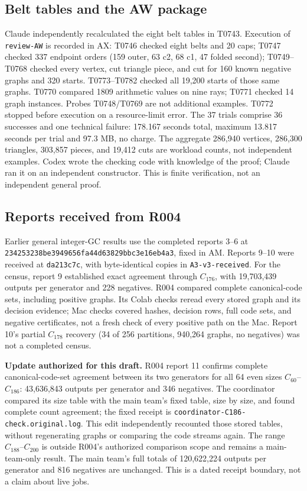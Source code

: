 \documentclass[11pt]{amsart}
\newcommand{\record}[1]{\nolinkurl{#1}}
\begin{document}
\subsection{Belt tables and the AW package}
Claude independently recalculated the eight belt tables in T0743.
Execution of \record{review-AW} is recorded in AX: T0746 checked eight
belts and 20 caps; T0747 checked 337 endpoint orders (159 outer,
63 c2, 68 c1, 47 folded second); T0749--T0768 checked every vertex,
cut triangle piece, and cut for 160 known negative graphs and 320
starts. T0773--T0782 checked all 19,200 starts of those same graphs.
T0770 compared 1809 arithmetic values on nine rays; T0771 checked
14 graph instances. Probes T0748/T0769 are not additional examples.
T0772 stopped before execution on a resource-limit error. The 37 trials
comprise 36 successes and one technical failure: 178.167 seconds total,
maximum 13.817 seconds per trial and 97.3 MB, no charge. The aggregate
286,940 vertices, 286,300 triangles, 303,857 pieces, and 19,412 cuts
are workload counts, not independent examples. Codex wrote the checking
code with knowledge of the proof; Claude ran it on an independent
constructor. This is finite verification, not an independent general proof.

\subsection{Reports received from R004}
Earlier general integer-GC results use the completed reports 3--6 at
\record{234253238be3949656fa44d63829bbc3e16eb4a3}, fixed in AM. Reports
9--10 were received at \record{da213c7c}, with byte-identical copies in
\record{A3-v3-received}. For the census, report 9 established exact
agreement through $C_{176}$, with 19,703,439 outputs per generator and
228 negatives. R004 compared complete canonical-code sets, including
positive graphs. Its Colab checks reread every stored graph and its
decision evidence; Mac checks covered hashes, decision rows, full code
sets, and negative certificates, not a fresh check of every positive
path on the Mac. Report 10's partial $C_{178}$ recovery (34 of 256
partitions, 940,264 graphs, no negatives) was not a completed census.

\textbf{Update authorized for this draft.} R004 report 11 confirms
complete canonical-code-set agreement between its two generators for
all 64 even sizes $C_{60}$--$C_{186}$: 43,636,843 outputs per generator
and 346 negatives. The coordinator compared its size table with the
main team's fixed table, size by size, and found complete count agreement;
the fixed receipt is \record{coordinator-C186-check.original.log}.
This edit independently recounted those stored tables, without
regenerating graphs or comparing the code streams again.
The range $C_{188}$--$C_{200}$ is outside R004's authorized comparison
scope and remains a main-team-only result. The main team's full totals
of 120,622,224 outputs per generator and 816 negatives are unchanged.
This is a dated receipt boundary, not a claim about live jobs.
\end{document}
